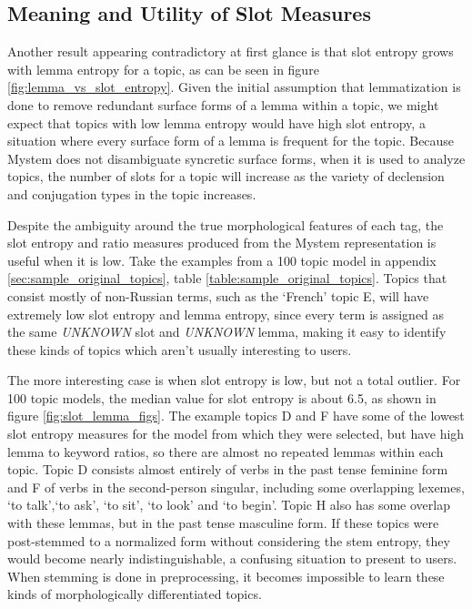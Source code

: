 \documentclass[11pt,a4paper]{article}
\begin{document}
\subsection{Meaning and Utility of Slot Measures}
Another result appearing contradictory at first glance is that slot entropy grows with lemma entropy for a topic, as can be seen in figure \ref{fig:lemma_vs_slot_entropy}. Given the initial assumption that lemmatization is done to remove redundant surface forms of a lemma within a topic, we might expect that topics with low lemma entropy would have high slot entropy, a situation where every surface form of a lemma is frequent for the topic. Because Mystem does not disambiguate syncretic surface forms, when it is used to analyze topics, the number of slots for a topic will increase as the variety of declension and conjugation types in the topic increases.

Despite the ambiguity around the true morphological features of each tag, the slot entropy and ratio measures produced from the Mystem representation is useful when it is low. Take the examples from a 100 topic model in appendix \ref{sec:sample_original_topics}, table \ref{table:sample_original_topics}. Topics that consist mostly of non-Russian terms, such as the `French' topic E, will have extremely low slot entropy and lemma entropy, since every term is assigned as the same \textit{UNKNOWN} slot and \textit{UNKNOWN} lemma, making it easy to identify these kinds of topics which aren't usually interesting to users.

The more interesting case is when slot entropy is low, but not a total outlier. For 100 topic models, the median value for slot entropy is about 6.5, as shown in figure \ref{fig:slot_lemma_figs}. The example topics D and F have some of the lowest slot entropy measures for the model from which they were selected, but have high lemma to keyword ratios, so there are almost no repeated lemmas within each topic. Topic D consists almost entirely of verbs in the past tense feminine form and F of verbs in the second-person singular, including some overlapping lexemes, `to talk',`to ask', `to sit', `to look' and `to begin'. Topic H also has some overlap with these lemmas, but in the past tense masculine form. If these topics were post-stemmed to a normalized form without considering the stem entropy, they would become nearly indistinguishable, a confusing situation to present to users. When stemming is done in preprocessing, it becomes impossible to learn these kinds of morphologically differentiated topics.
\end{document}
